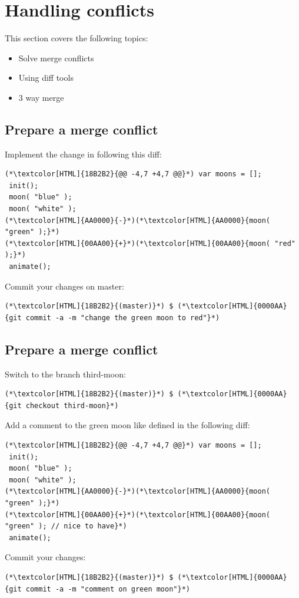 \section{Handling conflicts}
\begin{frame}[fragile]
  \slidetitle
  This section covers the following topics:
  \begin{itemize}
    \item Solve merge conflicts
    \item Using diff tools
    \item 3 way merge
  \end{itemize}
\end{frame}

\subsection{Prepare a merge conflict}
\begin{frame}[fragile]
  \subslidetitle
  Implement the change in  following this diff:
  \begin{lstlisting}
(*\textcolor[HTML]{18B2B2}{@@ -4,7 +4,7 @@}*) var moons = [];
 init();
 moon( "blue" );
 moon( "white" );
(*\textcolor[HTML]{AA0000}{-}*)(*\textcolor[HTML]{AA0000}{moon( "green" );}*)
(*\textcolor[HTML]{00AA00}{+}*)(*\textcolor[HTML]{00AA00}{moon( "red" );}*)
 animate();
\end{lstlisting}

  Commit your changes on master:
  \begin{lstlisting}
(*\textcolor[HTML]{18B2B2}{(master)}*) $ (*\textcolor[HTML]{0000AA}{git commit -a -m "change the green moon to red"}*)
\end{lstlisting}

\end{frame}

\subsection{Prepare a merge conflict}
\begin{frame}[fragile]
  \subslidetitle

  Switch to the branch third-moon:
  \begin{lstlisting}
(*\textcolor[HTML]{18B2B2}{(master)}*) $ (*\textcolor[HTML]{0000AA}{git checkout third-moon}*)
\end{lstlisting}

  Add a comment to the green moon like defined in the following diff:
  \begin{lstlisting}
(*\textcolor[HTML]{18B2B2}{@@ -4,7 +4,7 @@}*) var moons = [];
 init();
 moon( "blue" );
 moon( "white" );
(*\textcolor[HTML]{AA0000}{-}*)(*\textcolor[HTML]{AA0000}{moon( "green" );}*)
(*\textcolor[HTML]{00AA00}{+}*)(*\textcolor[HTML]{00AA00}{moon( "green" ); // nice to have}*)
 animate();
\end{lstlisting}

  Commit your changes:
  \begin{lstlisting}
(*\textcolor[HTML]{18B2B2}{(master)}*) $ (*\textcolor[HTML]{0000AA}{git commit -a -m "comment on green moon"}*)
\end{lstlisting}
\end{frame}

